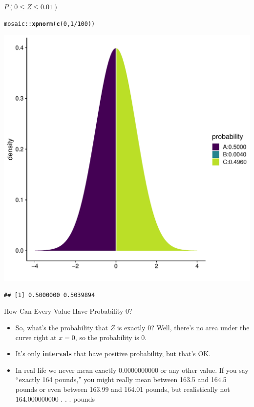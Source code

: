 \documentclass[10pt]{beamer}\usepackage[]{graphicx}\usepackage[]{color}
\makeatletter
\newcommand{\hlnum}[1]{\textcolor[rgb]{0.686,0.059,0.569}{#1}}%
\newcommand{\hlopt}[1]{\textcolor[rgb]{0,0,0}{#1}}%
\newcommand{\hlstd}[1]{\textcolor[rgb]{0.345,0.345,0.345}{#1}}%
\newcommand{\hlkwd}[1]{\textcolor[rgb]{0.737,0.353,0.396}{\textbf{#1}}}%
\newenvironment{kframe}{%
 \def\at@end@of@kframe{}%
 \ifinner\ifhmode%
  \def\at@end@of@kframe{\end{minipage}}%
  \begin{minipage}{\columnwidth}%
 \fi\fi%
 \def\FrameCommand##1{\hskip\@totalleftmargin \hskip-\fboxsep
 \colorbox{shadecolor}{##1}\hskip-\fboxsep
     \hskip-\linewidth \hskip-\@totalleftmargin \hskip\columnwidth}%
 \MakeFramed {\advance\hsize-\width
   \@totalleftmargin\z@ \linewidth\hsize
   \@setminipage}}%
 {\par\unskip\endMakeFramed%
 \at@end@of@kframe}
\newenvironment{knitrout}{}{} %
\makeatother
\begin{document}
\begin{frame}[fragile]{$P(0 \leq Z \leq 0.01)$}

	
\begin{knitrout}\tiny
{}\color{fgcolor}\begin{kframe}
\begin{alltt}
\hlstd{mosaic}\hlopt{::}\hlkwd{xpnorm}\hlstd{(}\hlkwd{c}\hlstd{(}\hlnum{0}\hlstd{,}\hlnum{1}\hlopt{/}\hlnum{100}\hlstd{))}
\end{alltt}
\end{kframe}

{\centering \includegraphics[width=0.60\linewidth]{figure/unnamed-chunk-3-1} 

}


\begin{kframe}\begin{verbatim}
## [1] 0.5000000 0.5039894
\end{verbatim}
\end{kframe}
\end{knitrout}
\end{frame}



\begin{frame}{How Can Every Value Have Probability 0?}
	
	\begin{itemize}
		  \setlength{\itemsep}{10pt}
		
		\item So, what’s the probability that $Z$ is exactly 0? Well, there's no
		area under the curve right at $x = 0$, so the probability is 0.
		
		\item It's only \textbf{intervals} that have positive probability, but that's OK.
		
		\item In real life we never mean exactly 0.0000000000 or any other
		value. If you say ``exactly 164 pounds,'' you might really mean
		between 163.5 and 164.5 pounds or even between 163.99
		and 164.01 pounds, but realistically not 164.000000000 . . .
		pounds
	\end{itemize}
	
\end{frame}
\end{document}
